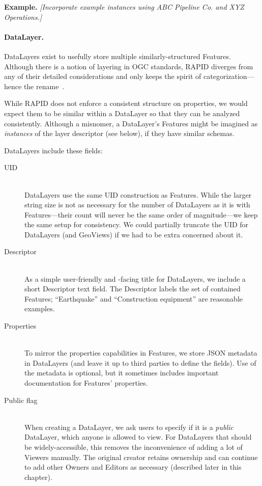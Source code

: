 \textbf{Example.} \textit{[Incorporate example instances using ABC Pipeline Co. and XYZ Operations.]}

\paragraph{DataLayer.}
DataLayers exist to usefully store multiple similarly-structured Features. Although there is a notion of layering in OGC standards, RAPID diverges from any of their detailed considerations and only keeps the spirit of categorization---hence the rename~\cite{AbstractSpecFaq,SFA,WFS}.

While RAPID does not enforce a consistent structure on properties, we would expect them to be similar within a DataLayer so that they can be analyzed consistently. Although a misnomer, a DataLayer's Features might be imagined as \textit{instances} of the layer descriptor (see below), if they have similar schemas.

DataLayers include these fields:

\begin{description}

\item[UID] \hfill \\
DataLayers use the same UID construction as Features. While the larger string size is not as necessary for the number of DataLayers as it is with Features---their count will never be the same order of magnitude---we keep the same setup for consistency. We could partially truncate the UID for DataLayers (and GeoViews) if we had to be extra concerned about it.

\item[Descriptor] \hfill \\
As a simple user-friendly and -facing title for DataLayers, we include a short Descriptor text field. The Descriptor labels the set of contained Features; ``Earthquake'' and ``Construction equipment'' are reasonable examples.

\item[Properties] \hfill \\
To mirror the properties capabilities in Features, we store JSON metadata in DataLayers (and leave it up to third parties to define the fields). Use of the metadata is optional, but it sometimes includes important documentation for Features' properties.

\item[Public flag] \hfill \\
When creating a DataLayer, we ask users to specify if it is a \textit{public} DataLayer, which anyone is allowed to view. For DataLayers that should be widely-accessible, this removes the inconvenience of adding a lot of Viewers manually. The original creator retains ownership and can continue to add other Owners and Editors as necessary (described later in this chapter).
  
\end{description}


